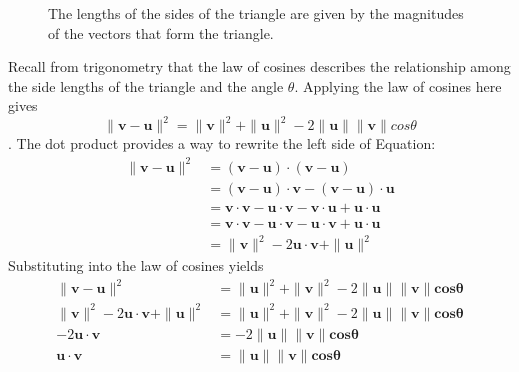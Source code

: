 \documentclass[oneside]{book}
\begin{document}
{{\begin{figure}[H]
\begin{center}
            \end{center}
            \caption{The lengths of the sides of the triangle are given by the magnitudes of the vectors that form the triangle.}
        \end{figure}
        Recall from trigonometry that the law of cosines describes the relationship among the side lengths of the triangle and the angle $\theta$. Applying the law of cosines here gives
        \[\|\mathbf{v-u}\|^{2}=\|\mathbf{v}\|^{2}+\|\mathbf{u}\|^{2}-2\|\mathbf{u}\|\|\mathbf{v}\|cos\theta\].
        The dot product provides a way to rewrite the left side of Equation:
        \begin{align}
            \|\mathbf{v-u}\|^{2}&=(\mathbf{v-u})\cdot(\mathbf{v-u})\\
                                &=(\mathbf{v-u})\cdot\mathbf{v}-(\mathbf{v-u})\cdot\mathbf{u}\\
                                &=\mathbf{v}\cdot\mathbf{v}-\mathbf{u}\cdot\mathbf{v}-\mathbf{v}\cdot\mathbf{u}+\mathbf{u}\cdot\mathbf{u}\\
                                &=\mathbf{v}\cdot\mathbf{v}-\mathbf{u}\cdot\mathbf{v}-\mathbf{u}\cdot\mathbf{v}+\mathbf{u}\cdot\mathbf{u}\\
                                &=\|\mathbf{v}\|^{2}-2\mathbf{u}\cdot\mathbf{v}+\|\mathbf{u}\|^{2}
        \end{align}
        Substituting into the law of cosines yields
        \begin{align}
            \|\mathbf{v-u}\|^{2}&=\|\mathbf{u}\|^{2}+\|\mathbf{v}\|^{2}-2\|\mathbf{u}\|\|\mathbf{v}\|\mathbf{cos\theta}\\            \|\mathbf{v}\|^{2}-2\mathbf{u}\cdot\mathbf{v}+\|\mathbf{u}\|^{2}&=\|\mathbf{u}\|^{2}+\|\mathbf{v}\|^{2}-2\|\mathbf{u}\|\|\mathbf{v}\|\mathbf{cos\theta}\\
            -2\mathbf{u}\cdot\mathbf{v}&=-2\|\mathbf{u}\|\|\mathbf{v}\|\mathbf{cos\theta}\\
            \mathbf{u}\cdot\mathbf{v}&=\|\mathbf{u}\|\|\mathbf{v}\|\mathbf{cos\theta}
        \end{align}
    }

}
\end{document}
